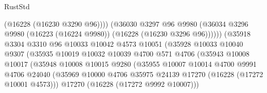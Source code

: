 \begin{lexlean}{RustStd}
\begin{coremodule}
                                          (@16228 (@16230 @3290 @96))))
                                      (@36030
                                        @3297
                                        @96
                                        @9980
                                        (@36034
                                          @3296
                                          @9980
                                          (@16223 (@16224 @9980))
                                          (@16228 (@16230 @3296 @96))))))
                                  (@35918
                                    @3304
                                    @3310
                                    @96
                                    @10033
                                    @10042
                                    @4573
                                    @10051
                                    (@35928
                                      @10033
                                      @10040
                                      @9307
                                      (@35935
                                        @10019
                                        @10032
                                        @10039
                                        @4700
                                        @571
                                        @4706
                                        (@35943
                                          @10008
                                          @10017
                                          (@35948
                                            @10008
                                            @10015
                                            @9280
                                            (@35955
                                              @10007
                                              @10014
                                              @4700
                                              @9991
                                              @4706
                                              @24040
                                              (@35969
                                                @10000
                                                @4706
                                                @35975
                                                @24139
                                                @17270
                                                (@16228 (@17272 @10001 @4573)))
                                              @17270
                                              (@16228 (@17272 @9992 @10007)))

\end{coremodule}
\end{lexlean}
